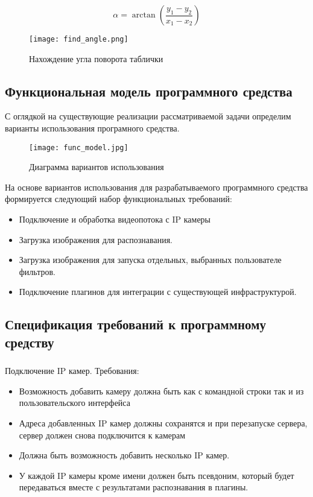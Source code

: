 $$ \alpha = \arctan(\frac{y_1 - y_2}{x_1 - x_2}) $$

\begin{figure}[ht]
\centering
    \texttt{[image: find\_angle.png]}  
    \caption{Нахождение угла поворота таблички}
    \label{fig:funcreq:analisys}
\end{figure}

\subsection{Функциональная модель программного средства}
\label{sec:funcreq:funcmodel}

С оглядкой на существующие реализации рассматриваемой задачи определим варианты использования програмного средства.

\begin{figure}[ht]
\centering
    \texttt{[image: func\_model.jpg]}  
    \caption{Диаграмма вариантов использования}
  \label{fig:funcreq:funcmodel}
\end{figure}

На основе вариантов использования для разрабатываемого программного средства формируется следующий набор функциональных требований:
\begin{itemize}
	\item Подключение и обработка видеопотока с IP камеры
	\item Загрузка изображения для распознавания.
	\item Загрузка изображения для запуска отдельных, выбранных пользователе фильтров.
	\item Подключение плагинов для интеграции с существующей инфраструктурой.
\end{itemize}

\subsection{Спецификация требований к программному средству}
\label{sec:fucreq:specification}

\subsubsection{}
Подключение IP камер. Требования:
\begin{itemize}
	\item Возможность добавить камеру должна быть как с командной строки так и из пользовательского интерфейса
	\item Адреса добавленных IP камер должны сохранятся и при перезапуске сервера, сервер должен снова подключится к камерам
	\item Должна быть возможность добавить несколько IP камер.
	\item У каждой IP камеры кроме имени должен быть псевдоним, который будет передаваться вместе с результатами распознавания в плагины. 
\end{itemize}

